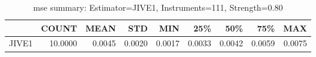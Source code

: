 \begin{table}[ht]
\centering
\caption{mse summary: Estimator=JIVE1, Instruments=111, Strength=0.80}
\begin{tabular}{lrrrrrrrr}
\toprule
 & COUNT & MEAN & STD & MIN & 25\% & 50\% & 75\% & MAX \\
\midrule
JIVE1 & 10.0000 & 0.0045 & 0.0020 & 0.0017 & 0.0033 & 0.0042 & 0.0059 & 0.0075 \\
\bottomrule
\end{tabular}
\end{table}
